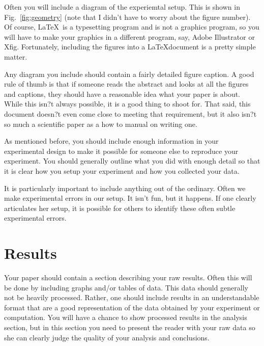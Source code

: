 \documentclass[twocolumn,pre,floats,aps,amsmath,amssymb]{revtex4}
\begin{document}
Often you will include a diagram of the experiemtal setup.  This is
shown in Fig.~\ref{fig:geometry} (note that I didn't have to worry
about the figure number).  Of course, \LaTeX\ is a typesetting program
and is not a graphics program, so you will have to make your graphics
in a different program, say, Adobe Illustrator or Xfig.  Fortunately,
including the figures into a \LaTeX document is a pretty simple
matter.



Any diagram you include should contain a fairly detailed figure
caption.  A good rule of thumb is that if someone reads the abstract
and looks at all the figures and captions, they should have a
reasonable idea what your paper is about.  While this isn?t always
possible, it is a good thing to shoot for.  That said, this document
doesn?t even come close to meeting that requirement, but it also isn?t
so much a scientific paper as a how to manual on writing one.

As mentioned before, you should include enough information in your
experimental design to make it possible for someone else to reproduce
your experiment.  You should generally outline what you did with
enough detail so that it is clear how you setup your experiment and
how you collected your data.  

It is particularly important to include anything out of the ordinary.
Often we make experimental errors in our setup.  It isn't fun, but it
happens.  If one clearly articulates her setup, it is possible for
others to identify these often subtle experimental errors.

\section{Results}
\label{sec:results}

Your paper should contain a section describing your raw results. 
Often this will be done by including graphs and/or tables of data. 
This data should generally not be heavily processed.  Rather, one
should include results in an understandable format that are a good
representation of the data obtained by your experiment or computation.
 You will have a chance to show processed results in the analysis
section, but in this section you need to present the reader with your
raw data so she can clearly judge the quality of your analysis and
conclusions. 
\end{document}
